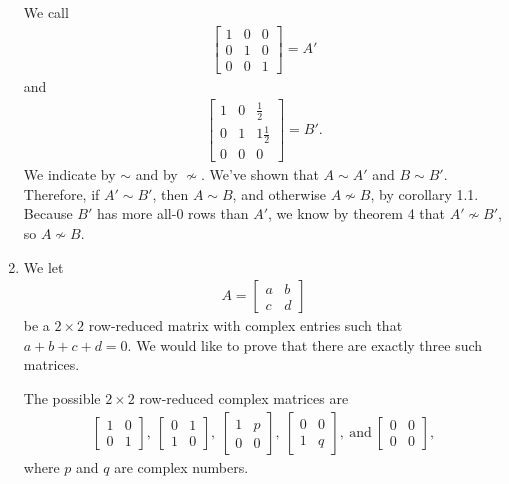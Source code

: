 \documentclass[12pt]{article}
\begin{document}
\begin{enumerate}
      We call
      \begin{align*}
        \begin{bmatrix}
          1 &  0 & 0\\
          0 &  1 & 0\\
          0 &  0 & 1
        \end{bmatrix}
        = A'
      \end{align*}
      and
      \begin{align*}
        \begin{bmatrix}
           1 &  0 &  \frac{1}{2}\\
           0 &  1 &  1\frac{1}{2}\\
           0 &  0 &  0
        \end{bmatrix}
        = B'.
      \end{align*}
      We indicate  by $\sim$ and
       by $\nsim$. We've shown that
      $A \sim A'$ and $B \sim B'$. Therefore, if $A' \sim B'$,
      then $A \sim B$, and otherwise $A \nsim B$, by corollary
      1.1. Because $B'$ has more all-0 rows than $A'$, we know by
      theorem 4 that $A' \nsim B'$, so $A \nsim B$.

    \item
      We let
      \begin{align*}
        A =
        \begin{bmatrix}
           a & b\\
           c & d
        \end{bmatrix}
      \end{align*}
      be a $2 \times 2$ row-reduced matrix with complex entries
      such that $a + b + c + d = 0$. We would like to prove that
      there are exactly three such matrices.

      The possible $2 \times 2$ row-reduced complex matrices are
      \begin{align*}
        \begin{bmatrix}
           1 & 0\\
           0 & 1
        \end{bmatrix},\ 
        \begin{bmatrix}
           0 & 1\\
           1 & 0
        \end{bmatrix},\ 
        \begin{bmatrix}
           1 & p\\
           0 & 0
        \end{bmatrix},\ 
        \begin{bmatrix}
           0 & 0\\
           1 & q
        \end{bmatrix},\ \text{and}\ 
        \begin{bmatrix}
           0 & 0\\
           0 & 0
        \end{bmatrix},
      \end{align*}
      where $p$ and $q$ are complex numbers.


\end{enumerate}
\end{document}
